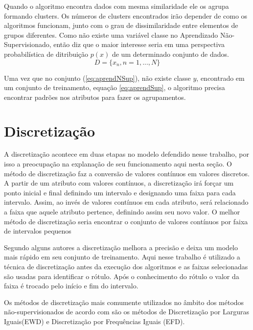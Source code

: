 Quando o algoritmo encontra dados com mesma similaridade ele os agrupa formando clusters. Os números de clusters encontrados irão depender de como os algoritmos funcionam, junto com o grau de dissimilaridade entre elementos de grupos diferentes. Como não existe uma variável classe no Aprendizado Não-Supervisionado, então \cite{Barber2011} diz que o maior interesse seria em uma perspectiva probabilística de ditribuição ${p(x)}$ de um determinado conjunto de dados.
\begin{equation}
 D = \{x_{n},n=1,...,N\}
 \label{eq:aprendNSup}
\end{equation}

Uma vez que no conjunto (\ref{eq:aprendNSup}), não existe classe ${y}$, encontrado em um conjunto de treinamento, equação \ref{eq:aprendSup}, o algoritmo precisa encontrar padrões nos atributos para fazer os agrupamentos.


\section{Discretização}\label{cap:refTeor:sec:discret}

A discretização acontece em duas etapas no modelo defendido nesse trabalho, por isso a preocupação na explanação de seu funcionamento aqui nesta seção. O método de discretização faz a conversão de valores contínuos em valores discretos. 
A partir de um atributo com valores contínuos, a discretização irá forçar um ponto inicial e final definindo um intervalo e designando uma faixa para cada intervalo. Assim, ao invés de valores contínuos em cada atributo, será relacionado a faixa que aquele atributo pertence, definindo assim seu novo valor. O melhor método de discretização seria encontrar o conjunto de valores contínuos por faixa de intervalos pequenos \cite{Kotsiantis2006}

Segundo alguns autores \cite{Catlett2006,Hwang2002} a discretização melhora a precisão e deixa um modelo mais rápido em seu conjunto de treinamento. Aqui nesse trabalho é utilizado a técnica de discretização antes da execução dos algoritmos e as faixas selecionadas são usadas para identificar o rótulo. Após o conhecimento do rótulo o valor da faixa é trocado pelo início e fim do intervalo.

Os métodos de discretização mais comumente utilizados no âmbito dos métodos  não-supervisionados de acordo com \cite{Kotsiantis2006, Dougherty1995} são os métodos de Discretização por Larguras Iguais(EWD) e Discretização por Frequências Iguais (EFD).

